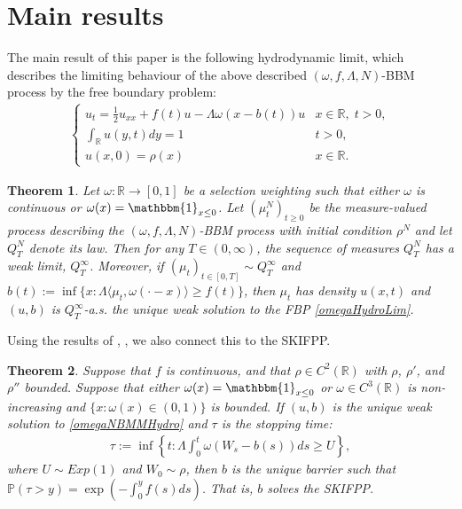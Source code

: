 \documentclass{article}
\newtheorem{theorem}{Theorem}
\newcommand{\B}[1]{\mathbb{#1}}
\newcommand{\is}{\mathbbm{1}}
\begin{document}

\section{Main results}

The main result of this paper is the following hydrodynamic limit, which describes the limiting behaviour of the above described $(\omega,f,\Lambda,N)$-BBM process by the free boundary problem:
\begin{align} \label{omegaNBMMHydro}
    \begin{cases}
        u_t = \frac12 u_{xx} + f(t)u - \Lambda\omega(x-b(t))u & x\in \B{R},\;t>0,\\
        \int_\B{R} u(y,t)dy = 1 & t>0,\\
        u(x,0)=\rho(x) & x\in \B{R}.
    \end{cases}
    \end{align}

\begin{theorem} \label{1stMainThemOmega}
    Let $\omega:\B{R}\to[0,1]$ be a selection weighting such that either $\omega$ is continuous or $\omega(x)=\is_{x\leq 0}$. Let $(\mu_t^N)_{t\geq 0}$ be the measure-valued process describing the $(\omega,f,\Lambda,N)$-BBM process with initial condition $\rho^N$ and let $Q_T^N$ denote its law. Then for any $T\in (0,\infty)$, the sequence of measures $Q_T^N$ has a weak limit, $Q_T^\infty$. Moreover, if $(\mu_t)_{t\in [0,T]}\sim Q_T^\infty$ and $b(t):=\inf\{x:\Lambda\langle \mu_t,\omega(\cdot-x)\rangle \geq f(t)\}$, then $\mu_t$ has density $u(x,t)$ and $(u,b)$ is $Q_T^\infty$-a.s. the unique weak solution to the FBP \eqref{omegaHydroLim}.
\end{theorem}

Using the results of \cite{ettingerHeningEvans}, \cite{ettingerHeningKwong}, we also connect this to the SKIFPP. 

\begin{theorem} \label{2ndMainThemOmega}
    Suppose that $f$ is continuous, and that $\rho\in C^2(\B{R})$ with $\rho$, $\rho'$, and $\rho''$ bounded. Suppose that either $\omega(x)=\is_{x\leq 0}$ or $\omega\in C^3(\B{R})$ is non-increasing and $\{x:\omega(x)\in (0,1)\}$ is bounded. If $(u,b)$ is the unique weak solution to \eqref{omegaNBMMHydro} and $\tau$ is the stopping time:
    \begin{align*}
        \tau:=\inf\left\{t:\Lambda\int_0^t \omega(W_s-b(s))ds\geq U\right\},
    \end{align*}
    where $U\sim Exp(1)$ and $W_0\sim \rho$, then $b$ is the unique barrier such that $\B{P}(\tau>y)=\exp(-\int_0^y f(s)ds)$. That is, $b$ solves the SKIFPP. 
\end{theorem}
\end{document}

